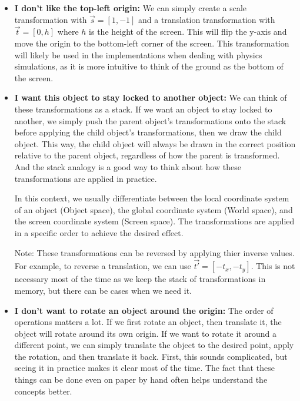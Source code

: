 \begin{itemize}
    \item \textbf{I don't like the top-left origin: } We can simply create a scale transformation with \(\vec{s} = [1, -1]\) and a translation transformation with \(\vec{t} = [0, h]\) where \(h\) is the height of the screen. This will flip the y-axis and move the origin to the bottom-left corner of the screen. This transformation will likely be used in the implementations when dealing with physics simulations, as it is more intuitive to think of the ground as the bottom of the screen.

    \item \textbf{I want this object to stay locked to another object: } We can think of these transformations as a stack. If we want an object to stay locked to another, we simply push the parent object's transformations onto the stack before applying the child object's transformations, then we draw the child object. This way, the child object will always be drawn in the correct position relative to the parent object, regardless of how the parent is transformed. And the stack analogy is a good way to think about how these transformations are applied in practice. 

    In this context, we usually differentiate between the local coordinate system of an object (Object space), the global coordinate system (World space), and the screen coordinate system (Screen space). The transformations are applied in a specific order to achieve the desired effect.

    Note: These transformations can be reversed by applying thier inverse values. For example, to reverse a translation, we can use \(\vec{t'} = [-t_x, -t_y]\). This is not necessary most of the time as we keep the stack of transformations in memory, but there can be cases when we need it.

    \item \textbf{I don't want to rotate an object around the origin: } The order of operations matters a lot. If we first rotate an object, then translate it, the object will rotate around its own origin. If we want to rotate it around a different point, we can simply translate the object to the desired point, apply the rotation, and then translate it back. First, this sounds complicated, but seeing it in practice makes it clear most of the time. The fact that these things can be done even on paper by hand often helps understand the concepts better.
\end{itemize}

\pagebreak
